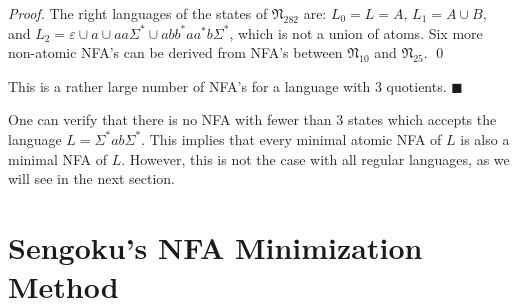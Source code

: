 \documentclass{llncs}
\newcommand{\eps}{\varepsilon}
\newcommand{\Sig}{\Sigma}
\newcommand{\fN}{{\mathfrak N}}
\newcommand{\qedb}{\hfill$\blacksquare$}
\begin{document}
\begin{example}
\begin{proof}
The right languages of the states of $\fN_{282}$ are:
$L_0=L=A$, 
$L_1=A\cup B$, and
$L_2=\eps \cup a  \cup aa\Sig^*\cup abb^*aa^*b\Sig^*$, which is not a union of atoms.
Six more non-atomic NFA's can be derived from NFA's between $\fN_{10}$ and  $\fN_{25}$.
\qed
\end{proof}


This is a rather large number of NFA's for a language with  3 quotients. 
\qedb
\end{example}

One can verify that there is no NFA with fewer than 3 states which
accepts the language $L=\Sig^*ab\Sig^*$.
This implies that every minimal atomic NFA of $L$ is also 
a minimal NFA of $L$.
However, this is not the case with all regular languages, as we will see 
in the next section. 


\section{Sengoku's NFA Minimization Method}
\label{sec:Sengoku}
\end{document}
